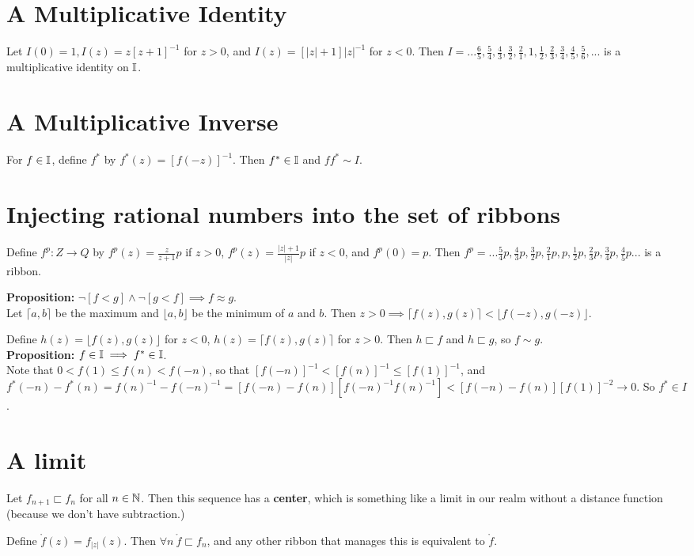 \documentclass{article}
\renewcommand{\b}{\textbf}
\newcommand{\ribbons}{\Bbb I}
\newcommand{\forks}{ \sqsubset}
\newcommand{\ident}{I}
\renewcommand{\center}{\mathring f  }
\begin{document}
\begin{huge}
{{\section{A Multiplicative Identity}

Let $\ident(0) = 1, \ident(z) = z[z+1]^{-1}$ for $z > 0$, and $\ident(z) = [|z|+1]|z|^{-1}$ for $z < 0$. Then  $\ident = ...\frac{6}{5},\frac{5}{4},\frac{4}{3},\frac{3}{2},\frac{2}{1},1,\frac{1}{2},\frac{2}{3},\frac{3}{4},\frac{4}{5},\frac{5}{6},... $ is a multiplicative identity on $\ribbons$. 

\section{A Multiplicative Inverse}

For $f \in \ribbons$, define $f^*$ by $f^*(z) =  [ f(-z) ]^{-1} $. Then $f^* \in \ribbons$ and $ff^* \sim \ident$.

\section{Injecting rational numbers into the set of ribbons}

Define $f^p : Z \to Q$ by $f^p(z) = \frac{z}{z+1}p$ if $z > 0$, $f^p(z) = \frac{|z|+1}{|z|}p$ if $z < 0$, and $f^p(0) = p$. Then $f^p = ... \frac{5}{4}p,\frac{4}{3}p,\frac{3}{2}p,\frac{2}{1}p,p,\frac{1}{2}p,\frac{2}{3}p,\frac{3}{4}p,\frac{4}{5}p ...$ is a ribbon.

\textbf{Proposition:} $\neg [ f < g ] \wedge \neg [ g < f ]  \implies f \approx g$.\\ 


Let $\lceil{a,b}\rceil$ be the maximum and $\lfloor{a,b}\rfloor$ be the minimum of $a$ and $b$.  Then  $z > 0  \implies \lceil f(z),g(z) \rceil < \lfloor f(-z),g(-z) \rfloor$. 

Define $h(z) = \lfloor f(z),g(z) \rfloor$ for $z < 0$, $h(z) = \lceil f(z),g(z) \rceil$ for $ z > 0$. Then $h \forks f$ and $h \forks g$, so $f \sim g$.\\

\b{Proposition:} $f \in \ribbons \implies f^* \in \ribbons$.\\


Note that $0 < f(1) \le f(n) < f(-n)$, so that $[f(-n)]^{-1} <  [f(n)]^{-1} \le [f(1)]^{-1}$, and $f^*(-n) - f^* (n) = f(n)^{-1} - f(-n)^{-1} = [f(-n) - f(n)][f(-n)^{-1}f(n)^{-1}] < [f(-n) - f(n)][f(1)]^{-2} \to 0$. So $f^* \in I$.\\

\section{A limit}

Let  $f_{n+1} \forks f_n$ for all $n \in \Bbb N$. Then this sequence has a \b{center}, which is something like a limit in our realm without a distance function (because we don't have subtraction.) 

Define $\center(z) =  f_{|z|}(z).$ Then $\forall n \ \center \forks f_n$, and any other ribbon that manages this is equivalent to $\center$.

}}

\end{huge}
\end{document}
